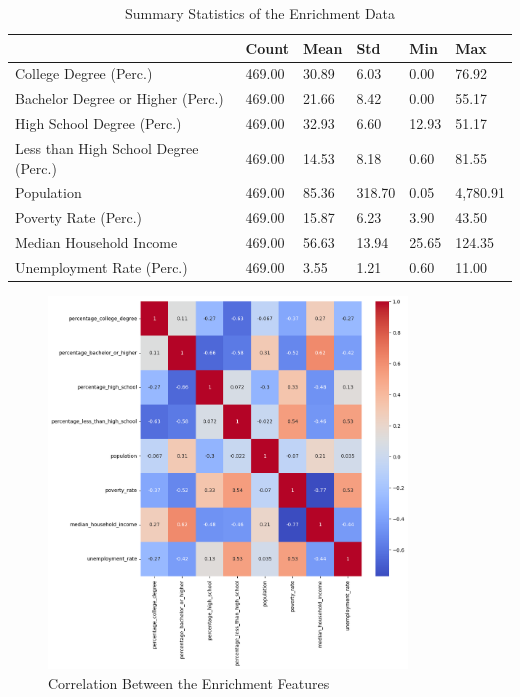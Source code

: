 \begin{table}[h]
    \centering
    \begin{tabularx}{\textwidth}{llllll}
    \hline
     & \textbf{Count} & \textbf{Mean} & \textbf{Std} & \textbf{Min} & \textbf{Max} \\
    \hline
    College Degree (Perc.) & 469.00 & 30.89 & 6.03 & 0.00 & 76.92 \\
    \hline
    Bachelor Degree or Higher (Perc.) & 469.00 & 21.66 & 8.42 & 0.00 & 55.17 \\
    \hline
    High School Degree (Perc.) & 469.00 & 32.93 & 6.60 & 12.93 & 51.17 \\
    \hline
    Less than High School Degree (Perc.) & 469.00 & 14.53 & 8.18 & 0.60 & 81.55 \\
    \hline
    Population & 469.00 & 85.36 & 318.70 & 0.05 & 4,780.91 \\
    \hline
    Poverty Rate (Perc.) & 469.00 & 15.87 & 6.23 & 3.90 & 43.50 \\
    \hline
    Median Household Income & 469.00 & 56.63 & 13.94 & 25.65 & 124.35 \\
    \hline
    Unemployment Rate (Perc.) & 469.00 & 3.55 & 1.21 & 0.60 & 11.00 \\
    \hline
    \end{tabularx}
    \caption{Summary Statistics of the Enrichment Data}
    \label{tab:enrichment_summary}
\end{table}

\begin{figure}[h]
    \centering
    \includegraphics[width=0.85\textwidth]{images/CH03_Enrichment_Correlation.png}
    \caption{Correlation Between the Enrichment Features}
    \label{fig:CH03_Enrichment_Correlation}
\end{figure}


